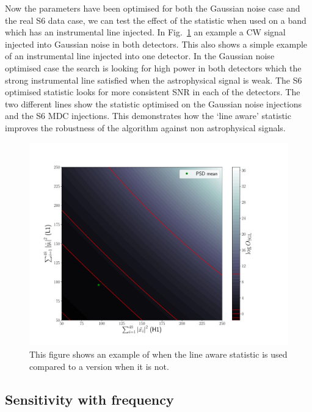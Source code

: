 Now the parameters have been optimised for both the Gaussian noise case and the real S6 data case, we can test the effect of the statistic when used on a band which has an instrumental line injected. 
In Fig.~\ref{viterbi:optimisation:vitexample} an example a \ac{CW} signal injected into Gaussian noise in both detectors. 
This also shows a simple example of an instrumental line injected into one detector. 
In the Gaussian noise optimised case the search is looking for high power in both detectors which the strong instrumental line satisfied when the astrophysical signal is weak. 
The S6 optimised statistic looks for more consistent \ac{SNR} in each of the detectors.
The two different lines show the statistic optimised on the Gaussian noise injections and the S6 \ac{MDC} injections.
This demonstrates how the `line aware' statistic improves the robustness of the algorithm against non astrophysical signals. 

\begin{figure}
    \centering
    \includegraphics[width=\linewidth]{C3_soap/lookup_noline.pdf}
    \caption{This figure shows an example of when the line aware statistic is used compared to a version when it is not.}
    \label{viterbi:optimisation:vitexample}
\end{figure}

\subsection{\label{viterbi:sens:freq}Sensitivity with frequency}

